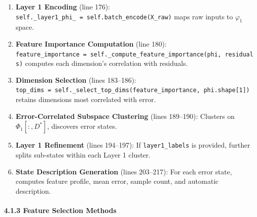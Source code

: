 \documentclass[
  12pt,
]{article}
\providecommand{\tightlist}{%
  \setlength{\itemsep}{0pt}\setlength{\parskip}{0pt}}
\begin{document}
\begin{enumerate}
\def\labelenumi{\arabic{enumi}.}
\tightlist
\item
  \textbf{Layer 1 Encoding} (line 176): \texttt{self.\_layer1\_phi\_\ =\ self.batch\_encode(X\_raw)} maps raw inputs to $\varphi_1$ space.
\item
  \textbf{Feature Importance Computation} (line 180): \texttt{feature\_importance\ =\ self.\_compute\_feature\_importance(phi,\ residuals)} computes each dimension's correlation with residuals.
\item
  \textbf{Dimension Selection} (lines 183--186): \texttt{top\_dims\ =\ self.\_select\_top\_dims(feature\_importance,\ phi.shape[1])} retains dimensions most correlated with error.
\item
  \textbf{Error-Correlated Subspace Clustering} (lines 189--190): Clusters on $\Phi_1[:, D^*]$, discovers error states.
\item
  \textbf{Layer 1 Refinement} (lines 194--197): If \texttt{layer1\_labels} is provided, further splits sub-states within each Layer 1 cluster.
\item
  \textbf{State Description Generation} (lines 203--217): For each error state, computes feature profile, mean error, sample count, and automatic description.
\end{enumerate}

\paragraph{4.1.3 Feature Selection Methods}\label{feature-selection-methods}
\end{document}
